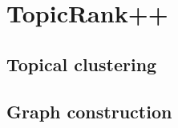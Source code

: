 \section{TopicRank++}
\label{sec:topicrankpp}

  \subsection{Topical clustering}
  \label{subsec:topical_clustering}

  \subsection{Graph construction}
  \label{subsec:graph_construction}

